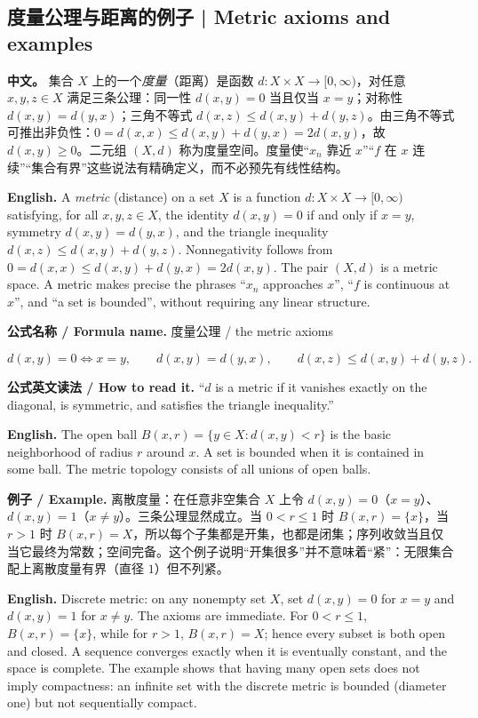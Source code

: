 \documentclass[UTF8,11pt,a4paper]{ctexart}
\newcommand{\EN}[1]{\par\noindent \textbf{English.} #1\par}
\newcommand{\READ}[1]{\par\noindent \textbf{公式英文读法 / How to read it.} #1\par}
\newcommand{\FORMULA}[2]{\par\noindent\textbf{公式名称 / Formula name.} #1 / #2\par}
\newcommand{\EX}[2]{\par\noindent \textbf{例子 / Example.} #1\par\EN{#2}}
\newcommand{\APS}[2]{\par\noindent\textbf{中文。} #1\par\noindent\textbf{English.} #2\par\smallskip}
\begin{document}
\subsection{度量公理与距离的例子 | Metric axioms and examples}
\APS{集合 $X$ 上的一个\emph{度量}（距离）是函数 $d:X\times X\to[0,\infty)$，对任意 $x,y,z\in X$ 满足三条公理：同一性 $d(x,y)=0$ 当且仅当 $x=y$；对称性 $d(x,y)=d(y,x)$；三角不等式 $d(x,z)\le d(x,y)+d(y,z)$。由三角不等式可推出非负性：$0=d(x,x)\le d(x,y)+d(y,x)=2d(x,y)$，故 $d(x,y)\ge0$。二元组 $(X,d)$ 称为度量空间。度量使“$x_n$ 靠近 $x$”“$f$ 在 $x$ 连续”“集合有界”这些说法有精确定义，而不必预先有线性结构。}{A \emph{metric} (distance) on a set $X$ is a function $d:X\times X\to[0,\infty)$ satisfying, for all $x,y,z\in X$, the identity $d(x,y)=0$ if and only if $x=y$, symmetry $d(x,y)=d(y,x)$, and the triangle inequality $d(x,z)\le d(x,y)+d(y,z)$. Nonnegativity follows from $0=d(x,x)\le d(x,y)+d(y,x)=2d(x,y)$. The pair $(X,d)$ is a metric space. A metric makes precise the phrases ``$x_n$ approaches $x$'', ``$f$ is continuous at $x$'', and ``a set is bounded'', without requiring any linear structure.}
\FORMULA{度量公理}{the metric axioms}
\[
d(x,y)=0\Longleftrightarrow x=y,\qquad
d(x,y)=d(y,x),\qquad
d(x,z)\le d(x,y)+d(y,z).
\]
\READ{``$d$ is a metric if it vanishes exactly on the diagonal, is symmetric, and satisfies the triangle inequality.''}
\EN{The open ball $B(x,r)=\{y\in X:d(x,y)<r\}$ is the basic neighborhood of radius $r$ around $x$. A set is bounded when it is contained in some ball. The metric topology consists of all unions of open balls.}

\EX{离散度量：在任意非空集合 $X$ 上令 $d(x,y)=0$（$x=y$）、$d(x,y)=1$（$x\ne y$）。三条公理显然成立。当 $0<r\le1$ 时 $B(x,r)=\{x\}$，当 $r>1$ 时 $B(x,r)=X$，所以每个子集都是开集，也都是闭集；序列收敛当且仅当它最终为常数；空间完备。这个例子说明“开集很多”并不意味着“紧”：无限集合配上离散度量有界（直径 $1$）但不列紧。}{Discrete metric: on any nonempty set $X$, set $d(x,y)=0$ for $x=y$ and $d(x,y)=1$ for $x\ne y$. The axioms are immediate. For $0<r\le1$, $B(x,r)=\{x\}$, while for $r>1$, $B(x,r)=X$; hence every subset is both open and closed. A sequence converges exactly when it is eventually constant, and the space is complete. The example shows that having many open sets does not imply compactness: an infinite set with the discrete metric is bounded (diameter one) but not sequentially compact.}
\end{document}
